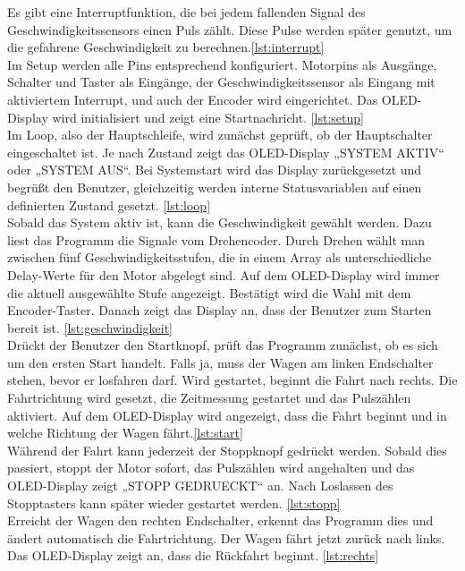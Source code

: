Es gibt eine Interruptfunktion, die bei jedem fallenden Signal des Geschwindigkeitssensors einen Puls zählt. Diese Pulse werden später genutzt, um die gefahrene Geschwindigkeit zu berechnen.\autoref{lst:interrupt}\\

Im Setup werden alle Pins entsprechend konfiguriert. Motorpins als Ausgänge, Schalter und Taster als Eingänge, der Geschwindigkeitssensor als Eingang mit aktiviertem Interrupt, und auch der Encoder wird eingerichtet. Das OLED-Display wird initialisiert und zeigt eine Startnachricht. \autoref{lst:setup}\\

Im Loop, also der Hauptschleife, wird zunächst geprüft, ob der Hauptschalter eingeschaltet ist. Je nach Zustand zeigt das OLED-Display „SYSTEM AKTIV“ oder „SYSTEM AUS“. Bei Systemstart wird das Display zurückgesetzt und begrüßt den Benutzer, gleichzeitig werden interne Statusvariablen auf einen definierten Zustand gesetzt. \autoref{lst:loop}\\

Sobald das System aktiv ist, kann die Geschwindigkeit gewählt werden. Dazu liest das Programm die Signale vom Drehencoder. Durch Drehen wählt man zwischen fünf Geschwindigkeitsstufen, die in einem Array als unterschiedliche Delay-Werte für den Motor abgelegt sind. Auf dem OLED-Display wird immer die aktuell ausgewählte Stufe angezeigt. Bestätigt wird die Wahl mit dem Encoder-Taster. Danach zeigt das Display an, dass der Benutzer zum Starten bereit ist.  \autoref{lst:geschwindigkeit}\\

Drückt der Benutzer den Startknopf, prüft das Programm zunächst, ob es sich um den ersten Start handelt. Falls ja, muss der Wagen am linken Endschalter stehen, bevor er losfahren darf. Wird gestartet, beginnt die Fahrt nach rechts. Die Fahrtrichtung wird gesetzt, die Zeitmessung gestartet und das Pulszählen aktiviert. Auf dem OLED-Display wird angezeigt, dass die Fahrt beginnt und in welche Richtung der Wagen fährt.\autoref{lst:start}\\

Während der Fahrt kann jederzeit der Stoppknopf gedrückt werden. Sobald dies passiert, stoppt der Motor sofort, das Pulszählen wird angehalten und das OLED-Display zeigt „STOPP GEDRUECKT“ an. Nach Loslassen des Stopptasters kann später wieder gestartet werden. \autoref{lst:stopp}\\

Erreicht der Wagen den rechten Endschalter, erkennt das Programm dies und ändert automatisch die Fahrtrichtung. Der Wagen fährt jetzt zurück nach links. Das OLED-Display zeigt an, dass die Rückfahrt beginnt. \autoref{lst:rechts}\\

